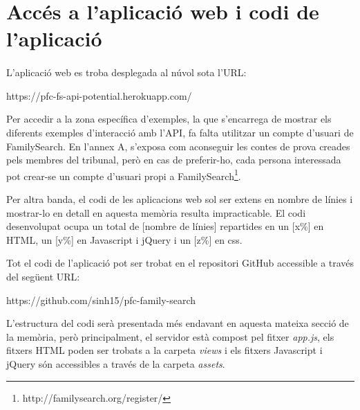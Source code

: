 \section{Accés a l'aplicació web i codi de l'aplicació}

    \paragraph{}
    L’aplicació web es troba desplegada al núvol sota l'URL:

    \begin{displayquote}
        https://pfc-fs-api-potential.herokuapp.com/
    \end{displayquote}

    Per accedir a la zona específica d’exemples, la que s’encarrega de mostrar els diferents exemples d’interacció amb l’API, fa falta utilitzar un compte d’usuari de FamilySearch. En l’annex A, s'exposa com aconseguir les contes de prova creades pels membres del tribunal, però en cas de preferir-ho, cada persona interessada pot crear-se un compte d’usuari propi a FamilySearch\footnote{http://familysearch.org/register/}.

    Per altra banda, el codi de les aplicacions web sol ser extens en nombre de línies i mostrar-lo en detall en aquesta memòria resulta impracticable. El codi desenvolupat ocupa un total de [nombre de línies] repartides en un  [x\%] en HTML, un [y\%] en Javascript i jQuery i un [z\%] en css.

    Tot el codi de l’aplicació pot ser trobat en el repositori GitHub accessible a través del següent URL:

    \begin{displayquote}
        https://github.com/sinh15/pfc-family-search
    \end{displayquote}

    L’estructura del codi serà presentada més endavant en aquesta mateixa secció de la memòria, però principalment, el servidor està compost pel fitxer \emph{app.js}, els fitxers HTML poden ser trobats a la carpeta \emph{views} i els fitxers Javascript i jQuery són accessibles a través de la carpeta \emph{assets}.
